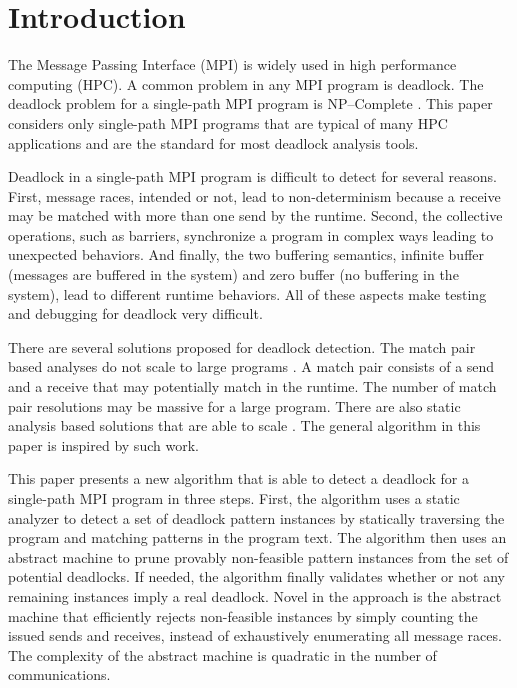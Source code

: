 \section{Introduction}

The Message Passing Interface (MPI) is widely used in high performance computing (HPC). A common problem in any MPI program is deadlock. The deadlock problem for a single-path MPI program is NP--Complete \cite{DBLP:conf/fm/ForejtKNS14}.
This paper considers only single-path MPI programs that are typical of many HPC applications and are the standard for most deadlock analysis tools.  

Deadlock in a single-path MPI program is difficult to detect for several reasons. First, message races, intended or not, lead to non-determinism because a receive may be matched with more than one send by the runtime. Second, the collective operations, such as barriers, synchronize a program in complex ways leading to unexpected behaviors. And finally, the two buffering semantics, infinite buffer (messages are buffered in the system) and zero buffer (no buffering in the system), lead to different runtime behaviors. All of these aspects make testing and debugging for deadlock very difficult. 

There are several solutions proposed for deadlock detection. The match pair based analyses do not scale to large programs \cite{DBLP:conf/ppopp/VakkalankaSGK08, DBLP:conf/sbmf/SharmaGB12, DBLP:conf/fm/ForejtKNS14}. A match pair consists of a send and a receive that may potentially match in the runtime. The number of match pair resolutions may be massive for a large program.
There are also static analysis based solutions that are able to scale \cite{DBLP:conf/sc/SharmaGB12, DBLP:conf/pldi/JoshiPSN09, Subodh:Dissertation}. The general algorithm in this paper is inspired by such work.

This paper presents a new algorithm that is able to detect a deadlock for a single-path MPI program in three steps. First, the algorithm uses a static analyzer to detect a set of deadlock pattern instances by statically traversing the program and matching patterns in the program text. The algorithm then uses an abstract machine to prune provably non-feasible pattern instances from the set of potential deadlocks. If needed, the algorithm finally validates whether or not any remaining instances imply a real deadlock. Novel in the approach is the abstract machine that efficiently rejects non-feasible instances by simply counting the issued sends and receives, instead of exhaustively enumerating all message races. The complexity of the abstract machine is quadratic in the number of communications. 

